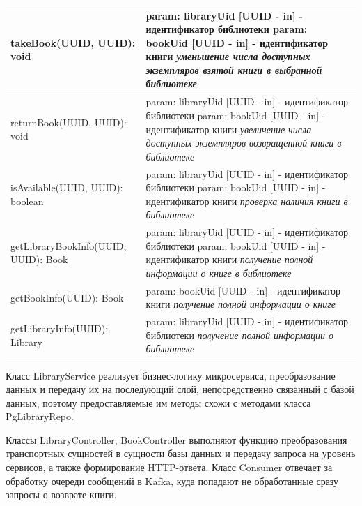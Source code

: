 \documentclass[a4paper, 12pt]{article}
\begin{document}
\begin{large}
\begin{longtable}{| p{8cm} | p{8cm} |}
	takeBook(UUID, UUID): void
	&
	param: libraryUid [UUID - in] - идентификатор библиотеки  \newline
	param: bookUid [UUID - in] - идентификатор книги \newline
	\textit{уменьшение числа доступных экземпляров взятой книги в выбранной библиотеке}\\
	\hline
	
	returnBook(UUID, UUID): void
	&
	param: libraryUid [UUID - in] - идентификатор библиотеки  \newline
	param: bookUid [UUID - in] - идентификатор книги \newline
	\textit{увеличение числа доступных экземпляров возвращенной книги в библиотеке}\\
	\hline
	
	isAvailable(UUID, UUID): boolean
	&
	param: libraryUid [UUID - in] - идентификатор библиотеки  \newline
	param: bookUid [UUID - in] - идентификатор книги \newline
	\textit{проверка наличия книги в библиотеке}\\
	\hline
	
	getLibraryBookInfo(UUID, UUID): Book
	&
	param: libraryUid [UUID - in] - идентификатор библиотеки  \newline
	param: bookUid [UUID - in] - идентификатор книги \newline
	\textit{получение полной информации о книге в библиотеке}\\
	\hline
	
	getBookInfo(UUID): Book
	&
	param: bookUid [UUID - in] - идентификатор книги \newline
	\textit{получение полной информации о книге}\\
	\hline
	
	getLibraryInfo(UUID): Library
	&
	param: libraryUid [UUID - in] - идентификатор библиотеки  \newline
	\textit{получение полной информации о библиотеке}\\
\end{longtable}

Класс LibraryService реализует бизнес-логику микросервиса, преобразование данных и передачу их на последующий слой, непосредственно связанный с базой данных, поэтому предоставляемые им методы схожи с методами класса PgLibraryRepo.

Классы LibraryController, BookController выполняют функцию преобразования транспортных сущностей в сущности базы данных и передачу запроса на уровень сервисов, а также формирование HTTP-ответа.
Класс Consumer отвечает за обработку очереди сообщений в Kafka, куда попадают не обработанные сразу запросы о возврате книги.


\end{large}
\end{document}
